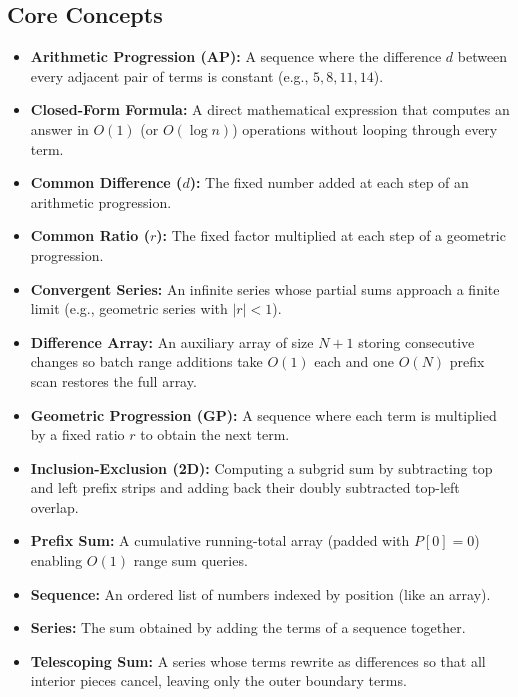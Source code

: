 \documentclass[11pt,a4paper]{article}
\theoremstyle{definition}
\begin{document}
\subsection*{Core Concepts}
\begin{itemize}[itemsep=0pt, topsep=1pt, parsep=0pt]
    \item \textbf{Arithmetic Progression (AP):} A sequence where the difference $d$ between every adjacent pair of terms is constant (e.g., $5, 8, 11, 14$).
    \item \textbf{Closed-Form Formula:} A direct mathematical expression that computes an answer in $O(1)$ (or $O(\log n)$) operations without looping through every term.
    \item \textbf{Common Difference ($d$):} The fixed number added at each step of an arithmetic progression.
    \item \textbf{Common Ratio ($r$):} The fixed factor multiplied at each step of a geometric progression.
    \item \textbf{Convergent Series:} An infinite series whose partial sums approach a finite limit (e.g., geometric series with $|r| < 1$).
    \item \textbf{Difference Array:} An auxiliary array of size $N + 1$ storing consecutive changes so batch range additions take $O(1)$ each and one $O(N)$ prefix scan restores the full array.
    \item \textbf{Geometric Progression (GP):} A sequence where each term is multiplied by a fixed ratio $r$ to obtain the next term.
    \item \textbf{Inclusion-Exclusion (2D):} Computing a subgrid sum by subtracting top and left prefix strips and adding back their doubly subtracted top-left overlap.
    \item \textbf{Prefix Sum:} A cumulative running-total array (padded with $P[0] = 0$) enabling $O(1)$ range sum queries.
    \item \textbf{Sequence:} An ordered list of numbers indexed by position (like an array).
    \item \textbf{Series:} The sum obtained by adding the terms of a sequence together.
    \item \textbf{Telescoping Sum:} A series whose terms rewrite as differences so that all interior pieces cancel, leaving only the outer boundary terms.
\end{itemize}
\end{document}
